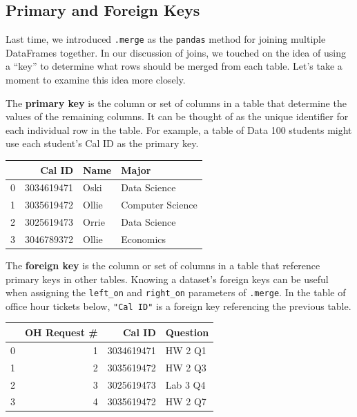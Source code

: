 \documentclass[
  letterpaper,
  DIV=11,
  numbers=noendperiod]{scrreprt}
\begin{document}
\hypertarget{primary-and-foreign-keys}{%
\subsection{Primary and Foreign Keys}\label{primary-and-foreign-keys}}

Last time, we introduced \texttt{.merge} as the \texttt{pandas} method
for joining multiple DataFrames together. In our discussion of joins, we
touched on the idea of using a ``key'' to determine what rows should be
merged from each table. Let's take a moment to examine this idea more
closely.

The \textbf{primary key} is the column or set of columns in a table that
determine the values of the remaining columns. It can be thought of as
the unique identifier for each individual row in the table. For example,
a table of Data 100 students might use each student's Cal ID as the
primary key.

\begin{tabular}{lrll}
\toprule
{} &      Cal ID &   Name &             Major \\
\midrule
0 &  3034619471 &   Oski &      Data Science \\
1 &  3035619472 &  Ollie &  Computer Science \\
2 &  3025619473 &  Orrie &      Data Science \\
3 &  3046789372 &  Ollie &         Economics \\
\bottomrule
\end{tabular}

The \textbf{foreign key} is the column or set of columns in a table that
reference primary keys in other tables. Knowing a dataset's foreign keys
can be useful when assigning the \texttt{left\_on} and
\texttt{right\_on} parameters of \texttt{.merge}. In the table of office
hour tickets below, \texttt{"Cal\ ID"} is a foreign key referencing the
previous table.

\begin{tabular}{lrrl}
\toprule
{} &  OH Request \# &      Cal ID &  Question \\
\midrule
0 &             1 &  3034619471 &   HW 2 Q1 \\
1 &             2 &  3035619472 &   HW 2 Q3 \\
2 &             3 &  3025619473 &  Lab 3 Q4 \\
3 &             4 &  3035619472 &   HW 2 Q7 \\
\bottomrule
\end{tabular}
\end{document}
